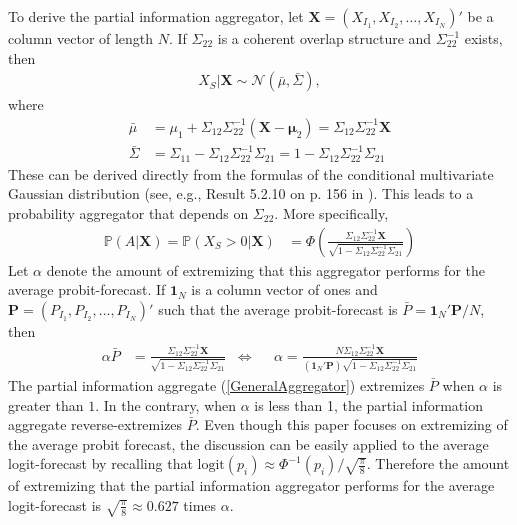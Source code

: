 \documentclass[11pt]{article}
\renewcommand{\P}{\mathbb{P}}
\theoremstyle{definition}
\theoremstyle{definition}
\begin{document}
To derive the partial information aggregator, let $\boldsymbol{X} = (X_{I_1}, X_{I_2},  \dots, X_{I_N})'$ be a column vector of length $N$. If $\Sigma_{22}$ is a coherent overlap structure and $\Sigma_{22}^{-1}$ exists, then 
\begin{align*}
X_{S} | \boldsymbol{X} \sim \mathcal{N}(\bar{\mu}, \bar{\Sigma}), 
\end{align*}
where
\begin{align}
\bar{\mu} &= \mu_1 + \Sigma_{12} \Sigma_{22}^{-1} (\boldsymbol{X} - \boldsymbol{\mu}_2) =  \Sigma_{12} \Sigma_{22}^{-1} \boldsymbol{X} \label{condMu}\\
 \bar{\Sigma}&= \Sigma_{11} - \Sigma_{12} \Sigma_{22}^{-1} \Sigma_{21} =1 - \Sigma_{12} \Sigma_{22}^{-1} \Sigma_{21}  \label{condSigma}
\end{align}
These can be derived directly from the formulas of the conditional multivariate Gaussian distribution (see, e.g., Result 5.2.10 on p. 156 in \cite{ravishanker2001first}). This leads to a probability aggregator that depends on $\Sigma_{22}$. More specifically,
\begin{align}
\P\left(A  | \boldsymbol{X}\right)  = \P\left(X_{S} > 0 | \boldsymbol{X}\right) &= \Phi\left( \frac{\Sigma_{12} \Sigma_{22}^{-1} \boldsymbol{X}}{\sqrt{1 - \Sigma_{12} \Sigma_{22}^{-1} \Sigma_{21}}}\right) \label{GeneralAggregator}
\end{align}
Let $\alpha$ denote the amount of extremizing that this aggregator performs for the average probit-forecast. If $\boldsymbol{1}_N$ is a column vector of ones and $\boldsymbol{P} = (P_{I_1}, P_{I_2}, \dots, P_{I_N})'$ such that the average probit-forecast is $\bar{P} = \boldsymbol{1}_N' \boldsymbol{P} /N$, then
\begin{align}
\alpha \bar{P}&=  \frac{\Sigma_{12} \Sigma_{22}^{-1} \boldsymbol{X}}{\sqrt{1 - \Sigma_{12} \Sigma_{22}^{-1} \Sigma_{21}}}  &\Leftrightarrow&& \alpha  = \frac{N \Sigma_{12} \Sigma_{22}^{-1} \boldsymbol{X}}{\left(\boldsymbol{1}_N' \boldsymbol{P} \right) \sqrt{1 - \Sigma_{12} \Sigma_{22}^{-1} \Sigma_{21}}} \label{alpha}
\end{align}
The partial information aggregate (\ref{GeneralAggregator}) extremizes $\bar{P}$ when $\alpha$ is greater than $1$. In the contrary, when $\alpha$ is less than 1, the partial information aggregate reverse-extremizes $\bar{P}$. Even though this paper focuses on extremizing of the average probit forecast, the discussion can be easily applied to the average logit-forecast by recalling that $\text{logit}(p_i) \approx \Phi^{-1}(p_i)/\sqrt{\frac{\pi}{8}}$. Therefore the amount of extremizing that the partial information aggregator performs for the average logit-forecast is $\sqrt{\frac{\pi}{8}} \approx 0.627$ times $\alpha$.  
\end{document}
